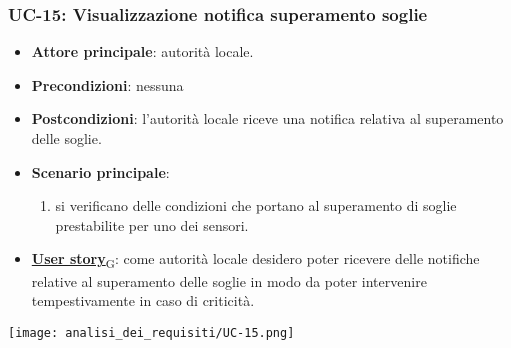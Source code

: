 \subsubsection{UC-15: Visualizzazione notifica superamento soglie}
\begin{itemize}
	\item \textbf{Attore principale}: autorità locale.
	\item \textbf{Precondizioni}: nessuna
	\item \textbf{Postcondizioni}: l'autorità locale riceve una notifica relativa al superamento delle soglie.
	\item \textbf{Scenario principale}:
	      \begin{enumerate}
		      \item si verificano delle condizioni che portano al superamento di soglie prestabilite per uno dei sensori.
	      \end{enumerate}
	\item \href{https://7last.github.io/docs/rtb/documentazione-interna/glossario\#user-story}{\textbf{User story}\textsubscript{G}}:
	      come autorità locale desidero poter ricevere delle notifiche relative al superamento delle soglie in modo da poter intervenire tempestivamente in caso di criticità.
\end{itemize}
\begin{center}
	\texttt{[image: analisi\_dei\_requisiti/UC-15.png]}
\end{center}

